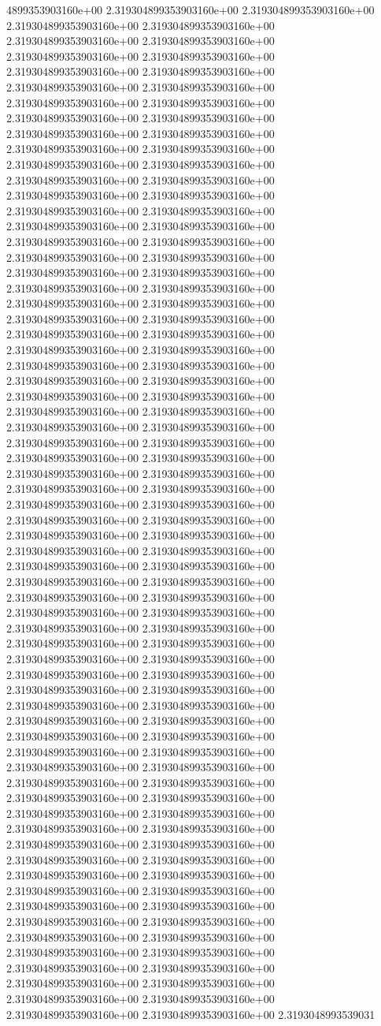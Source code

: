 4899353903160e+00	2.319304899353903160e+00	2.319304899353903160e+00	2.319304899353903160e+00	2.319304899353903160e+00	2.319304899353903160e+00	2.319304899353903160e+00	2.319304899353903160e+00	2.319304899353903160e+00	2.319304899353903160e+00	2.319304899353903160e+00	2.319304899353903160e+00	2.319304899353903160e+00	2.319304899353903160e+00	2.319304899353903160e+00	2.319304899353903160e+00	2.319304899353903160e+00	2.319304899353903160e+00	2.319304899353903160e+00	2.319304899353903160e+00	2.319304899353903160e+00	2.319304899353903160e+00	2.319304899353903160e+00	2.319304899353903160e+00	2.319304899353903160e+00	2.319304899353903160e+00	2.319304899353903160e+00	2.319304899353903160e+00	2.319304899353903160e+00	2.319304899353903160e+00	2.319304899353903160e+00	2.319304899353903160e+00	2.319304899353903160e+00	2.319304899353903160e+00	2.319304899353903160e+00	2.319304899353903160e+00	2.319304899353903160e+00	2.319304899353903160e+00	2.319304899353903160e+00	2.319304899353903160e+00	2.319304899353903160e+00	2.319304899353903160e+00	2.319304899353903160e+00	2.319304899353903160e+00	2.319304899353903160e+00	2.319304899353903160e+00	2.319304899353903160e+00	2.319304899353903160e+00	2.319304899353903160e+00	2.319304899353903160e+00	2.319304899353903160e+00	2.319304899353903160e+00	2.319304899353903160e+00	2.319304899353903160e+00	2.319304899353903160e+00	2.319304899353903160e+00	2.319304899353903160e+00	2.319304899353903160e+00	2.319304899353903160e+00	2.319304899353903160e+00	2.319304899353903160e+00	2.319304899353903160e+00	2.319304899353903160e+00	2.319304899353903160e+00	2.319304899353903160e+00	2.319304899353903160e+00	2.319304899353903160e+00	2.319304899353903160e+00	2.319304899353903160e+00	2.319304899353903160e+00	2.319304899353903160e+00	2.319304899353903160e+00	2.319304899353903160e+00	2.319304899353903160e+00	2.319304899353903160e+00	2.319304899353903160e+00	2.319304899353903160e+00	2.319304899353903160e+00	2.319304899353903160e+00	2.319304899353903160e+00	2.319304899353903160e+00	2.319304899353903160e+00	2.319304899353903160e+00	2.319304899353903160e+00	2.319304899353903160e+00	2.319304899353903160e+00	2.319304899353903160e+00	2.319304899353903160e+00	2.319304899353903160e+00	2.319304899353903160e+00	2.319304899353903160e+00	2.319304899353903160e+00	2.319304899353903160e+00	2.319304899353903160e+00	2.319304899353903160e+00	2.319304899353903160e+00	2.319304899353903160e+00	2.319304899353903160e+00	2.319304899353903160e+00	2.319304899353903160e+00	2.319304899353903160e+00	2.319304899353903160e+00	2.319304899353903160e+00	2.319304899353903160e+00	2.319304899353903160e+00	2.319304899353903160e+00	2.319304899353903160e+00	2.319304899353903160e+00	2.319304899353903160e+00	2.319304899353903160e+00	2.319304899353903160e+00	2.319304899353903160e+00	2.319304899353903160e+00	2.319304899353903160e+00	2.319304899353903160e+00	2.319304899353903160e+00	2.319304899353903160e+00	2.319304899353903160e+00	2.319304899353903160e+00	2.319304899353903160e+00	2.319304899353903160e+00	2.319304899353903160e+00	2.319304899353903160e+00	2.319304899353903160e+00	2.319304899353903160e+00	2.319304899353903160e+00	2.319304899353903160e+00	2.319304899353903160e+00	2.319304899353903160e+00	2.319304899353903160e+00	2.319304899353903160e+00	2.319304899353903160e+00	2.319304899353903160e+00	2.3193048993539031